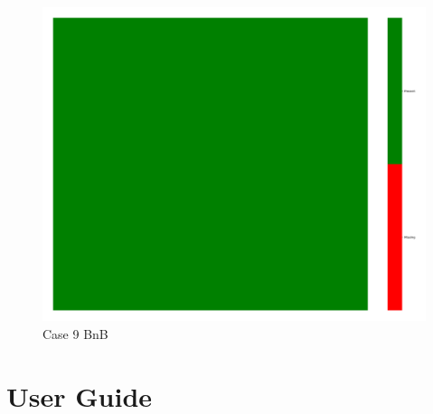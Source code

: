 \documentclass[a4paper,12pt]{article}
\begin{document}
\begin{figure}[H]
    \includegraphics[width=\linewidth]{case10_bnb_heatmap_cleaned.png}
    \caption*{Case 9 BnB}
\end{figure}



\newpage
\section{User Guide}


\end{document}
